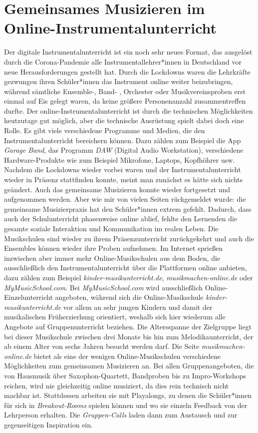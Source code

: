 \section{Gemeinsames Musizieren im Online-Instrumentalunterricht}

Der digitale Instrumentalunterricht ist ein noch sehr neues Format, das
ausgelöst durch die Corona-Pandemie alle Instrumentallehrer*innen in Deutschland
vor neue Herausforderungen gestellt hat. Durch die Lockdowns waren die
Lehrkräfte gezwungen ihren Schüler*innen das Instrument online weiter
beizubringen, während sämtliche Ensemble-, Band- , Orchester oder
Musikvereinsproben erst einmal auf Eis gelegt waren, da keine größere
Personenanzahl zusammentreffen durfte. Der online-Instrumentalunterricht ist durch die technischen
Möglichkeiten heutzutage gut möglich, aber die technische Ausrüstung spielt
dabei doch eine Rolle. Es gibt viele verschiedene Programme und Medien, die den
Instrumentalunterricht bereichern können. Dazu zählen zum Beispiel die App
\emph{Garage Band}, das Programm \emph{DAW} (Digital Audio Workstation),
verschiedene Hardware-Produkte wie zum Beispiel Mikrofone, Laptops, Kopfhöhrer
usw. Nachdem die Lockdowns wieder vorbei waren und der Instrumentalunterricht
wieder in Präsenz stattfinden konnte, meint man zunächst es hätte sich nichts
geändert. Auch das gemeinsame Musizieren konnte wieder fortgesetzt und
aufgenommen werden. Aber wie mir von vielen Seiten rückgemeldet wurde: die
gemeinsame Musizierpraxis hat den Schüler*innen extrem gefehlt. Dadurch, dass
auch der Schulunterricht phasenweise online ablief, fehlte den Lernenden die
gesamte soziale Interaktion und Kommunikation im realen Leben. Die Musikschulen
sind wieder zu ihrem Präsenzunterricht zurückgekehrt und auch die Ensembles
können wieder ihre Proben aufnehmen. Im Internet sprießen inzwischen aber immer
mehr Online-Musikschulen aus dem Boden, die ausschließlich den
Instrumentalunterricht über die Plattformen online anbieten, dazu zählen zum
Beispiel \emph{kinder-musikunterricht.de}, \emph{musikmachen-online.de} oder
\emph{MyMusicSchool.com}. Bei \emph{MyMusicSchool.com} wird ausschließlich
Online-Einzelunterricht angeboten, während sich die Online-Musikschule
\emph{kinder-musikunterricht.de} vor allem an sehr jungen Kindern und damit der
musikalischen Früherzierhung orientiert, weshalb sich hier wiederum alle Angebote auf
Gruppenunterricht beziehen. Die Altersspanne der Zielgruppe liegt bei dieser
Musikschule zwischen drei Monate bis hin zum Melodikaunterricht, der ab einem
Alter von sechs Jahren besucht werden darf. \autocite{online_musikschule_emp}
Die Seite \emph{musikmachen-online.de} bietet als eine der wenigen
Online-Musikschulen verschiedene Möglichkeiten zum gemeinsamen Musizieren an.
\autocite{online_musikschule_mmo} Bei allen Gruppenangeboten, die von Hausmusik
über Saxophon-Quartett, Bandproben bis zu Impro-Workshops reichen, wird nie
gleichzeitig online musiziert, da dies rein technisch nicht machbar ist.
Stattdessen arbeiten sie mit Playalongs, zu denen die Schüler*innen für sich in
\emph{Breakout-Rooms} spielen können und wo sie einzeln Feedback von der
Lehrperson erhalten. Die \emph{Gruppen-Calls} laden dann zum Austausch und zur
gegenseitigen Inspiration ein. \autocite{online_musikschule_mmo}



